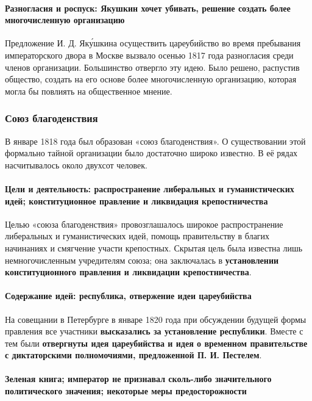 \documentclass{article}
\begin{document}
\paragraph{Разногласия и роспуск: Якушкин хочет убивать, решение создать более многочисленную организацию}

Предложение И. Д. Як\'{у}шкина осуществить цареубийство во время пребывания императорского двора в Москве вызвало осенью 1817 года разногласия среди членов организации. Большинство отвергло эту идею. Было решено, распустив общество, создать на его основе более многочисленную организацию, которая могла бы повлиять на общественное мнение.

\subsubsection{Союз благоденствия}

В январе 1818 года был образован «союз благоденствия». О существовании этой формально тайной организации было достаточно широко известно. В её рядах насчитывалось около двухсот человек.

\paragraph{Цели и деятельность: распространение либеральных и гуманистических идей; конституционное правление и ликвидация крепостничества}

Целью «союза благоденствия» провозглашалось широкое распространение либеральных и гуманистических идей, помощь правительству в благих начинаниях и смягчение участи крепостных. Скрытая цель была известна лишь немногочисленным учредителям союза; она заключалась в \textbf{установлении конституционного правления и ликвидации крепостничества}.

\paragraph{Содержание идей: республика, отвержение идеи цареубийства}

На совещании в Петербурге в январе 1820 года при обсуждении будущей формы правления все участники \textbf{высказались за установление республики}. Вместе с тем были \textbf{отвергнуты идея цареубийства и идея о временном правительстве с диктаторскими полномочиями, предложенной П. И. Пестелем}.

\paragraph{Зеленая книга; император не признавал сколь-либо значительного политического значения; некоторые меры предосторожности}
\end{document}
